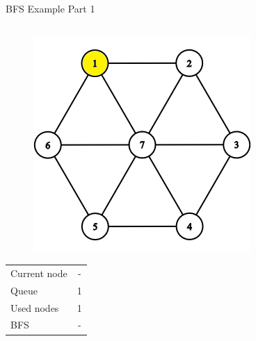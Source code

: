\documentclass[aspectratio=169]{beamer}%
\begin{document}
\begin{frame}{BFS Example Part 1}
    \begin{columns}
        \begin{column}{0.32\textwidth}
            \begin{figure}[!ht]
                \centering
                \includegraphics[width=0.9\linewidth]{bfs 1.png}
            \end{figure}
            \begin{table}[ht]
                \centering
                \begin{tabular}{l c}
                    Current node & -\\
                    Queue & 1 \\ 
                    Used nodes & 1\\
                    BFS & -
                \end{tabular}
            \end{table}
        \end{column}
        \hfill
        \begin{column}{0.32\textwidth}
            \begin{figure}[!ht]
                \centering

\end{figure}
\end{column}
\end{columns}
\end{frame}
\end{document}
